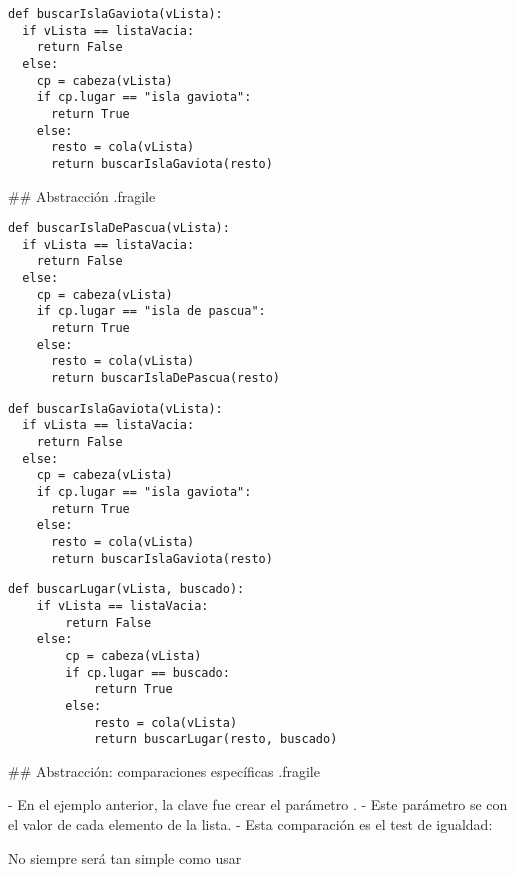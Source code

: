\begin{lstlisting}[style=frame03]
def buscarIslaGaviota(vLista):
  if vLista == listaVacia:
    return False
  else:
    cp = cabeza(vLista)
    if cp.lugar == "isla gaviota":
      return True
    else:
      resto = cola(vLista)
      return buscarIslaGaviota(resto)
\end{lstlisting}
\trmcolumns

## Abstracción {.fragile}

\bgncolumns
{}
\vspace{-2ex}

\begin{lstlisting}[style=frame03]
def buscarIslaDePascua(vLista):
  if vLista == listaVacia:
    return False
  else:
    cp = cabeza(vLista)
    if cp.lugar == "isla de pascua":
      return True
    else:
      resto = cola(vLista)
      return buscarIslaDePascua(resto)
\end{lstlisting}

\vspace{-2ex}

\begin{lstlisting}[style=frame03]
def buscarIslaGaviota(vLista):
  if vLista == listaVacia:
    return False
  else:
    cp = cabeza(vLista)
    if cp.lugar == "isla gaviota":
      return True
    else:
      resto = cola(vLista)
      return buscarIslaGaviota(resto)
\end{lstlisting}
\trmcolumns

\bgncolumns
{}

\begin{lstlisting}[style=frame03]
def buscarLugar(vLista, buscado):
    if vLista == listaVacia:
        return False
    else:
        cp = cabeza(vLista)
        if cp.lugar == buscado:
            return True
        else:
            resto = cola(vLista)
            return buscarLugar(resto, buscado)
\end{lstlisting}

\trmcolumns

## Abstracción: comparaciones específicas {.fragile}

- En el ejemplo anterior, la clave fue crear el parámetro .
- Este parámetro se  con el valor de cada elemento de la lista.
    - Esta comparación es el test de igualdad: \ttt{==}

\bgnblockidea
No siempre será tan simple como usar \ttt{==}
\trmblockidea


